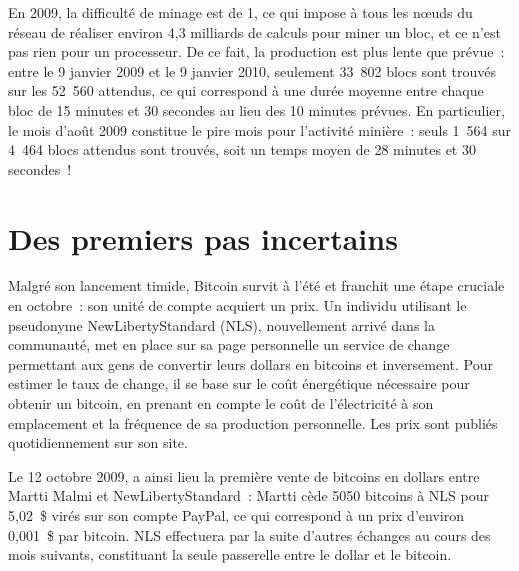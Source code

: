 En 2009, la difficulté de minage est de 1, ce qui impose à tous les nœuds du réseau de réaliser environ 4,3 milliards de calculs pour miner un bloc, et ce n'est pas rien pour un processeur. De ce fait, la production est plus lente que prévue~: entre le 9 janvier 2009 et le 9 janvier 2010, seulement 33~802 blocs sont trouvés sur les 52~560 attendus, ce qui correspond à une durée moyenne entre chaque bloc de 15 minutes et 30 secondes au lieu des 10 minutes prévues. En particulier, le mois d'août 2009 constitue le pire mois pour l'activité minière~: seuls 1~564 sur 4~464 blocs attendus sont trouvés, soit un temps moyen de 28 minutes et 30 secondes~!


\section*{Des premiers pas incertains}

Malgré son lancement timide, Bitcoin survit à l'été et franchit une étape cruciale en octobre~: son unité de compte acquiert un prix. Un individu utilisant le pseudonyme NewLibertyStandard (NLS), nouvellement arrivé dans la communauté, met en place sur sa page personnelle un service de change permettant aux gens de convertir leurs dollars en bitcoins et inversement. Pour estimer le taux de change, il se base sur le coût énergétique nécessaire pour obtenir un bitcoin, en prenant en compte le coût de l'électricité à son emplacement et la fréquence de sa production personnelle. Les prix sont publiés quotidiennement sur son site.

Le 12 octobre 2009, a ainsi lieu la première vente de bitcoins en dollars entre Martti Malmi et NewLibertyStandard~: Martti cède 5050 bitcoins à NLS pour 5,02~\$ virés sur son compte PayPal, ce qui correspond à un prix d'environ 0,001~\$ par bitcoin. NLS effectuera par la suite d'autres échanges au cours des mois suivants, constituant la seule passerelle entre le dollar et le bitcoin. %

